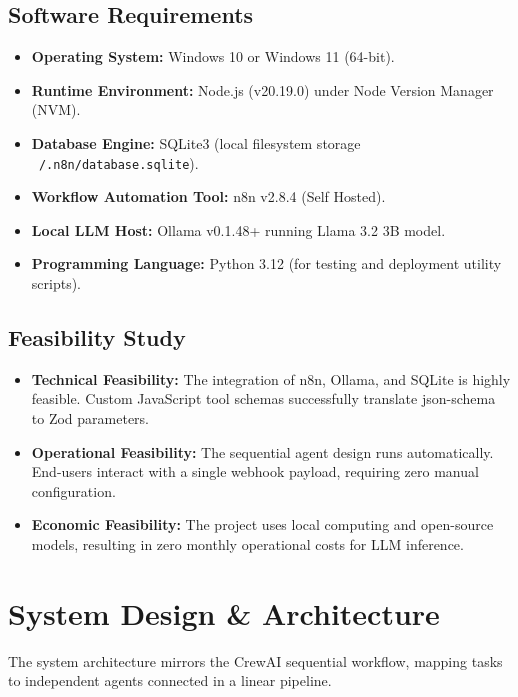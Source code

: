 \documentclass[12pt,a4paper]{report}
\begin{document}
\section{Software Requirements}
\begin{itemize}
    \item \textbf{Operating System:} Windows 10 or Windows 11 (64-bit).
    \item \textbf{Runtime Environment:} Node.js (v20.19.0) under Node Version Manager (NVM).
    \item \textbf{Database Engine:} SQLite3 (local filesystem storage \texttt{~/.n8n/database.sqlite}).
    \item \textbf{Workflow Automation Tool:} n8n v2.8.4 (Self Hosted).
    \item \textbf{Local LLM Host:} Ollama v0.1.48+ running Llama 3.2 3B model.
    \item \textbf{Programming Language:} Python 3.12 (for testing and deployment utility scripts).
\end{itemize}

\section{Feasibility Study}
\begin{itemize}
    \item \textbf{Technical Feasibility:} The integration of n8n, Ollama, and SQLite is highly feasible. Custom JavaScript tool schemas successfully translate json-schema to Zod parameters.
    \item \textbf{Operational Feasibility:} The sequential agent design runs automatically. End-users interact with a single webhook payload, requiring zero manual configuration.
    \item \textbf{Economic Feasibility:} The project uses local computing and open-source models, resulting in zero monthly operational costs for LLM inference.
\end{itemize}

\clearpage
\chapter{System Design \& Architecture}
The system architecture mirrors the CrewAI sequential workflow, mapping tasks to independent agents connected in a linear pipeline.
\end{document}
